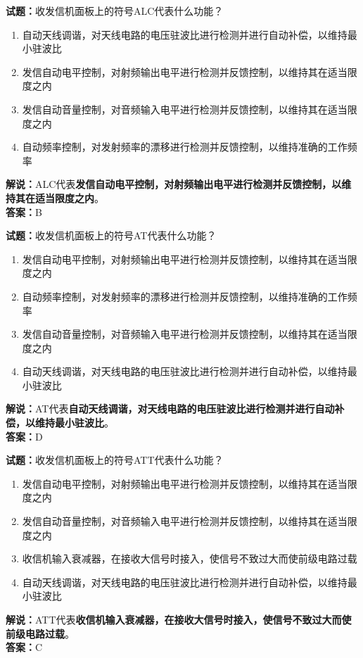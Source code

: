\documentclass{ctexbook}
\begin{document}
\vspace{1em}

\textbf{试题：}收发信机面板上的符号ALC代表什么功能？
\begin{enumerate}[leftmargin=3em]
  \item 自动天线调谐，对天线电路的电压驻波比进行检测并进行自动补偿，以维持最小驻波比
  \item 发信自动电平控制，对射频输出电平进行检测并反馈控制，以维持其在适当限度之内
  \item 发信自动音量控制，对音频输入电平进行检测并反馈控制，以维持其在适当限度之内
  \item 自动频率控制，对发射频率的漂移进行检测并反馈控制，以维持准确的工作频率
\end{enumerate}
\noindent\textbf{解说：}ALC代表\textbf{发信自动电平控制，对射频输出电平进行检测并反馈控制，以维持其在适当限度之内}。\\\noindent\textbf{答案：}B

\vspace{1em}

\textbf{试题：}收发信机面板上的符号AT代表什么功能？
\begin{enumerate}[leftmargin=3em]
  \item 发信自动电平控制，对射频输出电平进行检测并反馈控制，以维持其在适当限度之内
  \item 自动频率控制，对发射频率的漂移进行检测并反馈控制，以维持准确的工作频率
  \item 发信自动音量控制，对音频输入电平进行检测并反馈控制，以维持其在适当限度之内
  \item 自动天线调谐，对天线电路的电压驻波比进行检测并进行自动补偿，以维持最小驻波比
\end{enumerate}
\noindent\textbf{解说：}AT代表\textbf{自动天线调谐，对天线电路的电压驻波比进行检测并进行自动补偿，以维持最小驻波比}。\\\noindent\textbf{答案：}D

\vspace{1em}

\textbf{试题：}收发信机面板上的符号ATT代表什么功能？
\begin{enumerate}[leftmargin=3em]
  \item 发信自动电平控制，对射频输出电平进行检测并反馈控制，以维持其在适当限度之内
  \item 发信自动音量控制，对音频输入电平进行检测并反馈控制，以维持其在适当限度之内
  \item 收信机输入衰减器，在接收大信号时接入，使信号不致过大而使前级电路过载
  \item 自动天线调谐，对天线电路的电压驻波比进行检测并进行自动补偿，以维持最小驻波比
\end{enumerate}
\noindent\textbf{解说：}ATT代表\textbf{收信机输入衰减器，在接收大信号时接入，使信号不致过大而使前级电路过载}。\\\noindent\textbf{答案：}C
\end{document}
